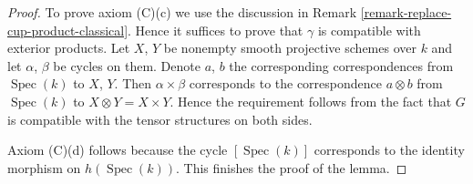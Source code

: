 \documentclass[10pt,a4paper]{amsart}
\theoremstyle{plain}
\theoremstyle{definition}
\theoremstyle{remark}
\numberwithin{equation}{subsection}
\def\Spec{\mathop{\mathrm{Spec}}}
\begin{document}
\begin{proof}
\medskip\noindent
To prove axiom (C)(c) we use the discussion in
Remark \ref{remark-replace-cup-product-classical}.
Hence it suffices to prove that $\gamma$ is compatible with
exterior products. Let $X$, $Y$ be nonempty smooth projective
schemes over $k$ and let $\alpha$, $\beta$ be cycles on them. Denote
$a$, $b$ the corresponding correspondences from $\Spec(k)$ to
$X$, $Y$. Then $\alpha \times \beta$ corresponds to the
correspondence $a \otimes b$ from $\Spec(k)$ to $X \otimes Y = X \times Y$.
Hence the requirement follows from the fact that $G$ is
compatible with the tensor structures on both sides.

\medskip\noindent
Axiom (C)(d) follows because the cycle $[\Spec(k)]$
corresponds to the identity morphism on $h(\Spec(k))$.
This finishes the proof of the lemma.
\end{proof}
\end{document}
